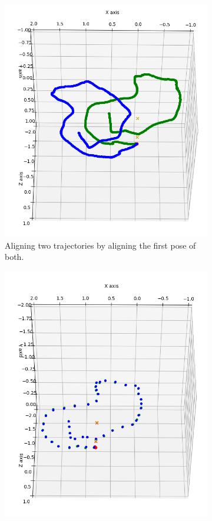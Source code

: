         \begin{figure}[ht]
            \centering
            \begin{subfigure}[b]{.32\textwidth}
                \includegraphics[width=.95\textwidth]{images/align_first_pair}
                \caption{Aligning two trajectories by aligning the first pose of both.}
                \label{sfig:align_first_pair}
            \end{subfigure}
            \begin{subfigure}[b]{.32\textwidth}
                \includegraphics[width=.95\textwidth]{images/align_global}

\end{subfigure}
\end{figure}
